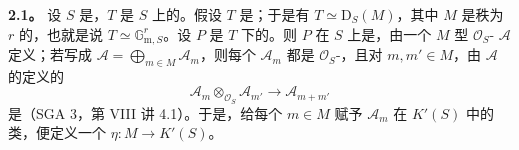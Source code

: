\textbf{2.1。} 设 $S$ 是，$T$ 是 $S$ 上的。假设 $T$ 是；于是有 $T\simeq\mathrm D_S(M)$，其中 $M$ 是秩为 $r$ 的，也就是说 $T\simeq\mathbb G_{\mathrm m,S}^r$。设 $P$ 是 $T$ 下的。则 $P$ 在 $S$ 上是，由一个 $M$ 型 $\mathcal O_S$- $\mathcal A$ 定义；若写成 $\mathcal A=\bigoplus_{m\in M}\mathcal A_m$，则每个 $\mathcal A_m$ 都是 $\mathcal O_S$-，且对 $m,m'\in M$，由 $\mathcal A$ 的定义的
\[
\mathcal A_m\otimes_{\mathcal O_S}\mathcal A_{m'}\longrightarrow\mathcal A_{m+m'}
\]
是（SGA 3，第 VIII 讲 4.1）。于是，给每个 $m\in M$ 赋予 $\mathcal A_m$ 在 $K'(S)$ 中的类，便定义一个 $\eta:M\to K'(S)$。

